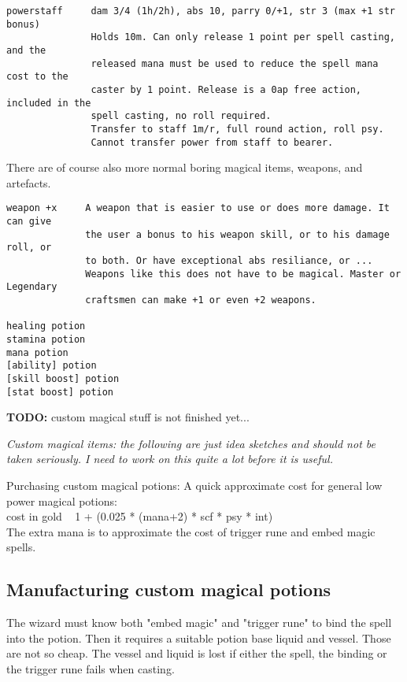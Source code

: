 \begin{verbatim}
powerstaff     dam 3/4 (1h/2h), abs 10, parry 0/+1, str 3 (max +1 str bonus)
               Holds 10m. Can only release 1 point per spell casting, and the
               released mana must be used to reduce the spell mana cost to the
               caster by 1 point. Release is a 0ap free action, included in the
               spell casting, no roll required.
               Transfer to staff 1m/r, full round action, roll psy.
               Cannot transfer power from staff to bearer.
\end{verbatim} \normalsize

There are of course also more normal boring magical items, weapons, and artefacts.

\small \begin{verbatim}
weapon +x     A weapon that is easier to use or does more damage. It can give
              the user a bonus to his weapon skill, or to his damage roll, or
              to both. Or have exceptional abs resiliance, or ...
              Weapons like this does not have to be magical. Master or Legendary
              craftsmen can make +1 or even +2 weapons.

healing potion
stamina potion
mana potion
[ability] potion
[skill boost] potion
[stat boost] potion
\end{verbatim} \normalsize


\textbf{TODO:} custom magical stuff is not finished yet...


\emph{Custom magical items: the following are just idea sketches and should not be taken seriously. I need to work on this quite a lot before it is useful.}

Purchasing custom magical potions: A quick approximate cost for general low power magical potions: \\
cost in gold ~ 1 + (0.025 * (mana+2) * scf * psy * int) \\
The extra mana is to approximate the cost of trigger rune and embed magic spells.


\subsection*{Manufacturing custom magical potions}
The wizard must know both "embed magic" and "trigger rune" to bind the spell into the potion. Then it requires a suitable potion base liquid and vessel. Those are not so cheap. The vessel and liquid is lost if either the spell, the binding or the trigger rune fails when casting.

